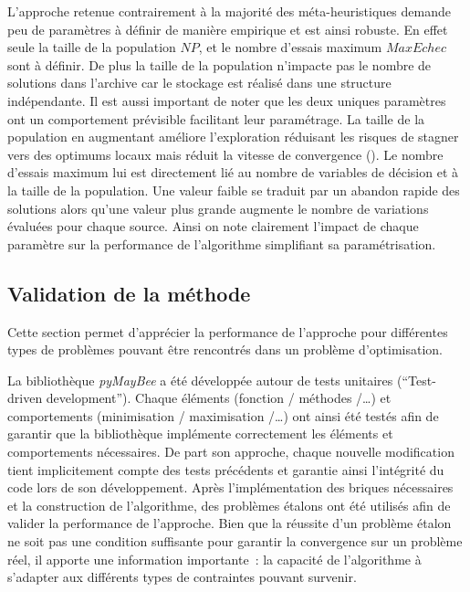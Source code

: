 L’approche retenue contrairement à la majorité des méta-heuristiques demande
peu de paramètres à définir de manière empirique et est ainsi robuste. En effet
seule la taille de la population $NP$, et le nombre d’essais maximum $MaxEchec$ sont à définir.
De plus la taille de la population n’impacte pas le nombre de solutions dans l’archive
car le stockage est réalisé dans une structure indépendante. Il est aussi important
de noter que les deux uniques paramètres ont un comportement prévisible facilitant
leur paramétrage. La taille de la population en augmentant améliore l’exploration
réduisant les risques de stagner vers des optimums locaux mais réduit la vitesse
de convergence ().
Le nombre d’essais maximum lui est directement lié au nombre de variables de décision
et à la taille de la population. Une valeur faible se traduit par un abandon rapide
des solutions alors qu’une valeur plus grande augmente le nombre de variations évaluées
pour chaque source. Ainsi on note clairement l’impact de chaque paramètre sur la
performance de l’algorithme simplifiant sa paramétrisation.





\subsection{Validation de la méthode} %
\label{sub:validation_de_la_methode}
Cette section permet d’apprécier la performance de l’approche pour différentes types
de problèmes pouvant être rencontrés dans un problème d’optimisation.

La bibliothèque \textit{pyMayBee} a été développée autour de tests unitaires (\enquote
{Test-driven development}). Chaque éléments (fonction / méthodes /\dots) et comportements
(minimisation / maximisation /\dots) ont ainsi été testés afin de garantir que la
bibliothèque implémente correctement les éléments et comportements nécessaires. De part
son approche, chaque nouvelle modification tient implicitement compte des tests précédents
et garantie ainsi l’intégrité du code lors de son développement. Après l’implémentation
des briques nécessaires et la construction de l’algorithme, des problèmes étalons ont été
utilisés afin de valider la performance de l’approche. Bien que la réussite d’un problème
étalon ne soit pas une condition suffisante pour garantir la convergence sur un problème
réel, il apporte une information importante~: la capacité de l’algorithme à s’adapter aux
différents types de contraintes pouvant survenir.

